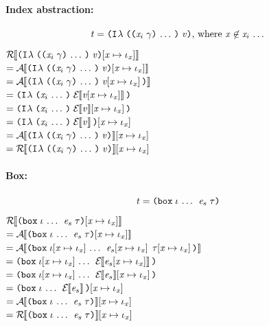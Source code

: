 \begin{sproof}
  \paragraph{Index abstraction:}
  \[\term = \ilam{\sequence{\notevar{\var_i}{\sort}}}{\val}\text{, where } \var \not\in \sequence{\var_i}\]
  $\EraseTrm{\idxsubst{\ilam{\sequence{\notevar{\var_i}{\sort}}}{\val}}}$ \\
  $= \EraseA{\idxsubst{\ilam{\sequence{\notevar{\var_i}{\sort}}}{\val}}}$ \\
  $= \EraseA{\ilam{\sequence{\notevar{\var_i}{\sort}}}{\idxsubst{\val}}}$ \\
  $= \ilam{\sequence{\var_i}}{\EraseE{\idxsubst{\val}}}$ \\
  $= \ilam{\sequence{\var_i}}{\idxsubst{\EraseE{\val}}}$ \\
  $= \idxsubst{\ilam{\sequence{\var_i}}{\EraseE{\val}}}$ \\
  $= \idxsubst{\EraseA{\ilam{\sequence{\notevar{\var_i}{\sort}}}{\val}}}$ \\
  $= \idxsubst{\EraseTrm{\ilam{\sequence{\notevar{\var_i}{\sort}}}{\val}}}$ \\

  \paragraph{Box:}
  \[\term = \dsum{\sequence{\idx}}{\expr_s}{\type}\]
  $\EraseTrm{\idxsubst{\dsum{\sequence{\idx}}{\expr_s}{\type}}}$ \\
  $= \EraseA{\idxsubst{\dsum{\sequence{\idx}}{\expr_s}{\type}}}$ \\
  $= \EraseA{\dsum{\sequence{\idxsubst{\idx}}}{\idxsubst{\expr_s}}{\idxsubst{\type}}}$ \\
  $= \dsum{\sequence{\idxsubst{\idx}}}{\EraseE{\idxsubst{\expr_s}}}{}$ \\
  $= \dsum{\sequence{\idxsubst{\idx}}}{\idxsubst{\EraseE{\expr_s}}}{}$ \\
  $= \idxsubst{\dsum{\sequence{\idx}}{\EraseE{\expr_s}}{}}$ \\
  $= \idxsubst{\EraseA{\dsum{\sequence{\idx}}{\expr_s}{\type}}}$ \\
  $= \idxsubst{\EraseTrm{\dsum{\sequence{\idx}}{\expr_s}{\type}}}$ \\


\end{sproof}
